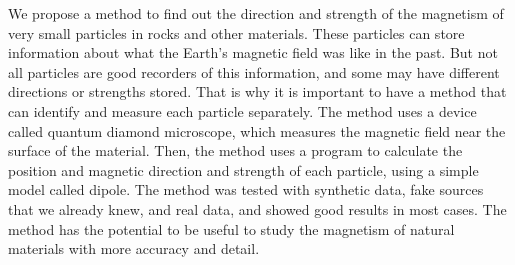 We propose a method to find out the direction and strength of the magnetism of very small particles in rocks and other materials. These particles can store information about what the Earth’s magnetic field was like in the past. But not all particles are good recorders of this information, and some may have different directions or strengths stored. That is why it is important to have a method that can identify and measure each particle separately. The method uses a device called quantum diamond microscope, which measures the magnetic field near the surface of the material. Then, the method uses a program to calculate the position and magnetic direction and strength of each particle, using a simple model called dipole. The method was tested with synthetic data, fake sources that we already knew, and real data, and showed good results in most cases. The method has the potential to be useful to study the magnetism of natural materials with more accuracy and detail.